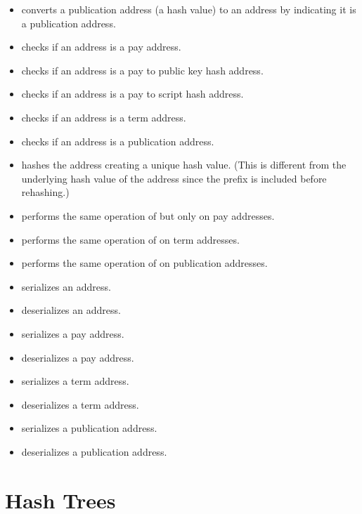\begin{itemize}
\item {} converts a publication address (a hash value) to an address by indicating it is a publication address.
\item {} checks if an address is a pay address.
\item {} checks if an address is a pay to public key hash address.
\item {} checks if an address is a pay to script hash address.
\item {} checks if an address is a term address.
\item {} checks if an address is a publication address.
\item {} hashes the address creating a unique hash value. (This is different from the underlying hash value of the address since the prefix is included before rehashing.)
\item {} performs the same operation of {} but only on pay addresses.
\item {} performs the same operation of {} on term addresses.
\item {} performs the same operation of {} on publication addresses.
\item {} serializes an address.
\item {} deserializes an address.
\item {} serializes a pay address.
\item {} deserializes a pay address.
\item {} serializes a term address.
\item {} deserializes a term address.
\item {} serializes a publication address.
\item {} deserializes a publication address.
\end{itemize}

\section{Hash Trees}

